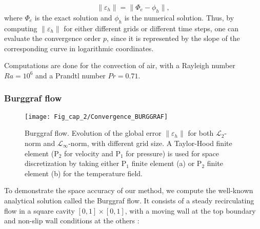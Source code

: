 \begin{equation}
  \| \varepsilon_h \| = \| \Phi_e - \phi_h \|,
\end{equation}
where $\Phi_e$ is the exact solution and $\phi_h$ is the numerical solution.
Thus, by computing $\| \varepsilon_h \|$ for either different grids or different time steps, one can evaluate the convergence order $p$, since it is represented by the slope of the corresponding curve in logarithmic coordinates.

Computations are done for the convection of air, with a Rayleigh number $Ra = 10^6$ and a Prandtl number $Pr = 0.71$.

\subsubsection{Burggraf flow} \label{subsub-conv-burg}

\begin{figure}
	\begin{center}
		\texttt{[image: Fig\_cap\_2/Convergence\_BURGGRAF]} 
	\end{center}
	\caption{Burggraf flow. Evolution of the global error $\| \varepsilon_h \|$ for both $\mathcal{L}_2$-norm and $\mathcal{L}_\infty$-norm, with different grid size. A Taylor-Hood finite element (P$_2$ for velocity and P$_1$ for pressure) is used for space discretization by taking either P$_1$ finite element (a) or P$_2$ finite element (b) for the temperature field.}
	\label{fig-conv-burggraf}
\end{figure}

To demonstrate the space accuracy of our method, we compute the well-known analytical solution called the Burggraf flow.
It consists of a steady recirculating flow in a square cavity $[ 0 , 1] \times [ 0 , 1]$, with a moving wall at the top boundary and non-slip wall conditions at the others :

